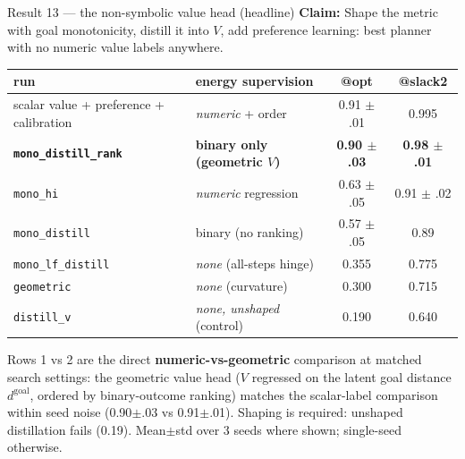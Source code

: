 \documentclass[aspectratio=169,10pt]{beamer}
\newcommand{\claim}[1]{\textcolor{cviolet}{\textbf{Claim:} #1}}
\begin{document}
\begin{frame}{Result 13 --- the non-symbolic value head (headline)}
\claim{Shape the metric with goal monotonicity, distill it into $V$, add preference learning:
best planner with no numeric value labels anywhere.}
\centering\small
\begin{tabular}{llcc}
\toprule
run & energy supervision & @opt & @slack2\\
\midrule
scalar value + preference + calibration & \emph{numeric} + order & 0.91 $\pm$ .01 & 0.995\\
\textbf{\texttt{mono\_distill\_rank}} & \textbf{binary only (geometric $V$)}
 & \textbf{0.90 $\pm$ .03} & \textbf{0.98 $\pm$ .01}\\
\texttt{mono\_hi} & \emph{numeric} regression & 0.63 $\pm$ .05 & 0.91 $\pm$ .02\\
\texttt{mono\_distill} & binary (no ranking) & 0.57 $\pm$ .05 & 0.89\\
\texttt{mono\_lf\_distill} & \emph{none} (all-steps hinge) & 0.355 & 0.775\\
\texttt{geometric} & \emph{none} (curvature) & 0.300 & 0.715\\
\texttt{distill\_v} & \emph{none, unshaped} (control) & 0.190 & 0.640\\
\bottomrule
\end{tabular}

\medskip\small
Rows 1 vs 2 are the direct \textbf{numeric-vs-geometric} comparison at
matched search settings: the geometric value head ($V$ regressed on the
latent goal distance $d^{\text{goal}}$, ordered by binary-outcome ranking)
matches the scalar-label comparison within seed noise (0.90$\pm$.03 vs
0.91$\pm$.01). Shaping is required: unshaped distillation fails (0.19).
Mean$\pm$std over 3 seeds where shown; single-seed otherwise.
\end{frame}
\end{document}
